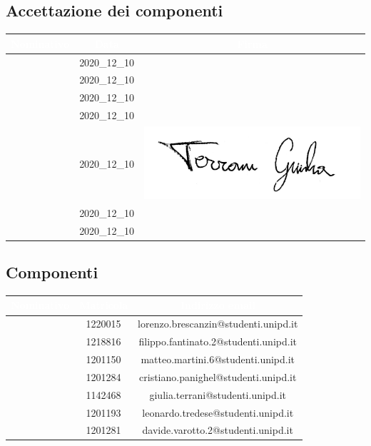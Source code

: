 \subsection{Accettazione dei componenti}
\begin{table}[H]
	\begin{center}
		\begin{tabular}{|c c c|}
			\rowcolor{darkblue}
			\textcolor{white}{Nominativo} 	& \textcolor{white}{Data} 	& \textcolor{white}{Firma} \\ \hline
							\BL 			&		2020\_12\_10			&\\ \hline
							\FF				&		2020\_12\_10			&\\ \hline
							\MM 			&		2020\_12\_10			&\\ \hline
							\PC 			&		2020\_12\_10			&\\ \hline
							\TG 			&		2020\_12\_10			&  \includegraphics{../../../Immagini/FirmaGiulia}\\ \hline
							\TL 			&		2020\_12\_10			&\\ \hline
							\VD 			&		2020\_12\_10			&\\ \hline
		\end{tabular}
	\end{center}
\end{table}

\subsection{Componenti}
\begin{table}[H]%
	\begin{center}
		\begin{tabular}{|c c c|}
			\rowcolor{darkblue}
			\textcolor{white}{Nominativo} 	& \textcolor{white}{Matricola} 	& \textcolor{white}{Indirizzo email} 		\\ \hline
							\BL 			&			1220015				&	lorenzo.brescanzin@studenti.unipd.it	\\ \hline
							\FF				&			1218816				&	filippo.fantinato.2@studenti.unipd.it	\\ \hline
							\MM 			&			1201150				&	matteo.martini.6@studenti.unipd.it		\\ \hline
							\PC 			&			1201284				&	cristiano.panighel@studenti.unipd.it	\\ \hline
							\TG 			&			1142468				&	giulia.terrani@studenti.unipd.it		\\ \hline
							\TL 			&			1201193				&	leonardo.tredese@studenti.unipd.it		\\ \hline
							\VD 			&			1201281				& 	davide.varotto.2@studenti.unipd.it		\\ \hline
		\end{tabular}
	\end{center}
\end{table}
